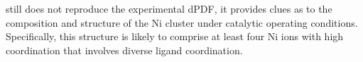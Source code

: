 still does not reproduce the experimental dPDF, it provides clues as to the composition and structure of the Ni cluster under catalytic operating conditions. Specifically, this structure is likely to comprise at least four Ni ions with high coordination that involves diverse ligand coordination. 






















